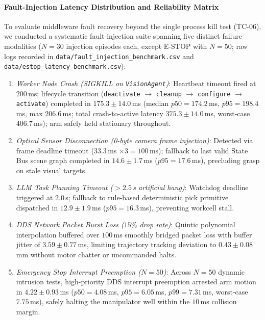 \documentclass[journal]{IEEEtran}
\begin{document}
\paragraph{Fault-Injection Latency Distribution and Reliability Matrix}
To evaluate middleware fault recovery beyond the single process kill test (TC-06), we conducted a systematic fault-injection suite spanning five distinct failure modalities ($N=30$ injection episodes each, except E-STOP with $N=50$; raw logs recorded in \texttt{data/fault\_injection\_benchmark.csv} and \texttt{data/estop\_latency\_benchmark.csv}):
\begin{enumerate}
    \item \textit{Worker Node Crash (SIGKILL on \texttt{VisionAgent})}: Heartbeat timeout fired at $200$\,ms; lifecycle transition (\texttt{deactivate} $\to$ \texttt{cleanup} $\to$ \texttt{configure} $\to$ \texttt{activate}) completed in $175.3 \pm 14.0$\,ms (median $p50 = 174.2$\,ms, $p95 = 198.4$\,ms, max $206.6$\,ms; total crash-to-active latency $375.3 \pm 14.0$\,ms, worst-case $406.7$\,ms); arm safely held stationary throughout.
    \item \textit{Optical Sensor Disconnection (0-byte camera frame injection)}: Detected via frame deadline timeout ($33.3$\,ms $\times 3 = 100$\,ms); fallback to last valid State Bus scene graph completed in $14.6 \pm 1.7$\,ms ($p95 = 17.6$\,ms), precluding grasp on stale visual targets.
    \item \textit{LLM Task Planning Timeout ($>2.5$\,s artificial hang)}: Watchdog deadline triggered at $2.0$\,s; fallback to rule-based deterministic pick primitive dispatched in $12.9 \pm 1.9$\,ms ($p95 = 16.3$\,ms), preventing workcell stall.
    \item \textit{DDS Network Packet Burst Loss ($15\%$ drop rate)}: Quintic polynomial interpolation buffered over $100$\,ms smoothly bridged packet loss with buffer jitter of $3.59 \pm 0.77$\,ms, limiting trajectory tracking deviation to $0.43 \pm 0.08$\,mm without motor chatter or uncommanded halts.
    \item \textit{Emergency Stop Interrupt Preemption ($N=50$)}: Across $N=50$ dynamic intrusion tests, high-priority DDS interrupt preemption arrested arm motion in $4.22 \pm 0.93$\,ms ($p50 = 4.08$\,ms, $p95 = 6.05$\,ms, $p99 = 7.31$\,ms, worst-case $7.75$\,ms), safely halting the manipulator well within the $10$\,ms collision margin.
\end{enumerate}
\end{document}
